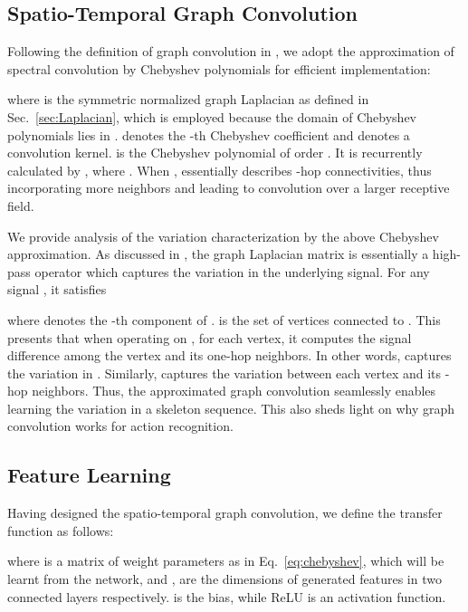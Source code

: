 \documentclass[conference]{IEEEtran}
\begin{document}
\subsection{Spatio-Temporal Graph Convolution}
\label{subsec:convolution}
Following the definition of graph convolution in \cite{defferrard2016convolutional}, we adopt the approximation of spectral convolution by Chebyshev polynomials for efficient implementation: 

where  is the symmetric normalized graph Laplacian as defined in Sec.~\ref{sec:Laplacian}, which is employed because the domain of Chebyshev polynomials lies in .  denotes the -th Chebyshev coefficient and  denotes a convolution kernel.  is the Chebyshev polynomial of order . It is recurrently calculated by , where . When ,  essentially describes -hop connectivities, thus incorporating more neighbors and leading to convolution over a larger receptive field.     

We provide analysis of the variation characterization by the above Chebyshev approximation. As discussed in \cite{Shuman2013The}, the graph Laplacian matrix  is essentially a high-pass operator which captures the variation in the underlying signal. For any signal , it satisfies

where  denotes the -th component of .  is the set of vertices connected to . This presents that when operating  on , for each vertex, it computes the signal difference among the vertex and its one-hop neighbors. In other words,  captures the variation in . Similarly,  captures the variation between each vertex and its -hop neighbors. Thus, the approximated graph convolution seamlessly enables learning the variation in a skeleton sequence. This also sheds light on why graph convolution works for action recognition.















\subsection{Feature Learning}
Having designed the spatio-temporal graph convolution, we define the transfer function as follows:

where  is a matrix of weight parameters  as in Eq.~\ref{eq:chebyshev}, which will be learnt from the network, and ,  are the dimensions of generated features in two connected layers respectively.  is the bias, while ReLU is an activation function. 
\end{document}
